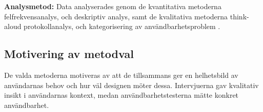 \textbf{Analysmetod:} Data analyserades genom de kvantitativa metoderna felfrekvensanalys, och deskriptiv analys, samt de kvalitativa metoderna think-aloud protokollanalys, och kategorisering av användbarhetsproblem .

\subsection{Motivering av metodval}

De valda metoderna motiveras av att de tillsammans ger en helhetsbild av användarnas behov och hur väl designen möter dessa. Intervjuerna gav kvalitativ insikt i användarnas kontext, medan användbarhetstesterna mätte konkret användbarhet.
